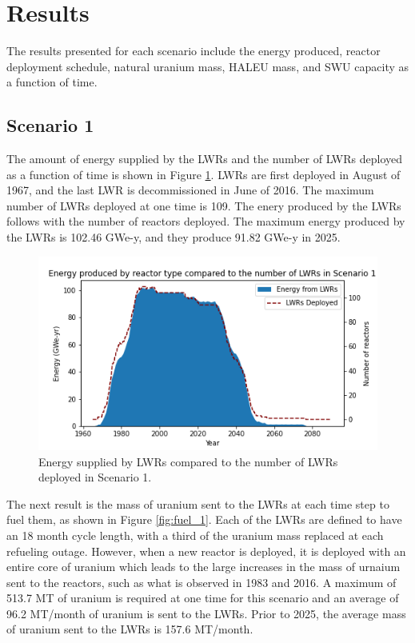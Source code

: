 \section{Results}
The results presented for each scenario include the energy produced, reactor 
deployment schedule, natural
uranium mass, \gls{HALEU} mass, and \gls{SWU} capacity as a function of time. 

\subsection{Scenario 1}
The amount of energy supplied by the \glspl{LWR} and the number of \glspl{LWR}
deployed as a function of time is shown in Figure \ref{fig:energy_rx_1}. 
\glspl{LWR} are first deployed in August of 1967, and the last 
\gls{LWR} is decommissioned in June of 2016. The maximum number of 
\glspl{LWR} deployed at one time is 109. The enery produced by the 
\glspl{LWR} follows with the number of reactors deployed. The maximum energy 
produced by the \glspl{LWR} is 102.46 GWe-y, and they produce 91.82 GWe-y 
in 2025.

\begin{figure}
    \centering 
    \includegraphics[scale=0.5]{figures/energy_scenario1.png}
    \caption{Energy supplied by \glspl{LWR} compared to the number of 
    \glspl{LWR} deployed in Scenario 1.}
    \label{fig:energy_rx_1}
\end{figure}

The next result is the mass of uranium sent to the \glspl{LWR} at each 
time step to fuel 
them, as shown in Figure \ref{fig:fuel_1}. Each of the \glspl{LWR} are 
defined to have an 18 month cycle length, with a third of the uranium 
mass replaced at each refueling outage. However, when a new reactor 
is deployed, it is deployed with an entire core of uranium which leads 
to the large increases in the mass of urnaium sent to the reactors, such 
as what is observed in 1983 and 2016. A maximum of 513.7 MT of uranium 
is required at one time for this scenario and an average of 96.2 MT/month 
of uranium is sent to the \glspl{LWR}. Prior to 2025, the average mass
of uranium sent to the \glspl{LWR} is 157.6 MT/month. 

